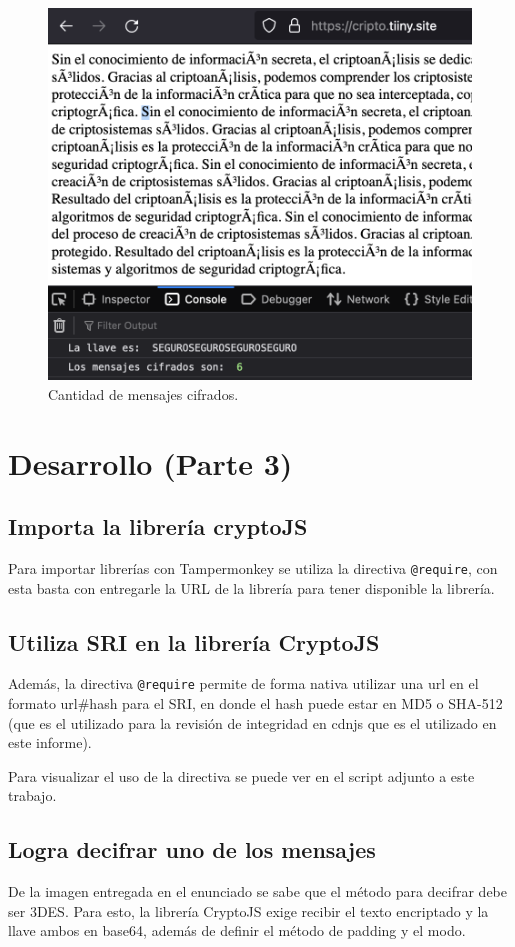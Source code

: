 \documentclass[letter,12pt]{article}
\newcommand{\code}[1]{\colorbox{lightgray!80}{\lstinline[breaklines=true]|#1|}}
\begin{document}
\begin{figure}[H]
  \centering
  \includegraphics[width=13cm]{images/02-cant-msg.png}
  \caption{Cantidad de mensajes cifrados.}
\end{figure}

\section{Desarrollo (Parte 3)}

\subsection{Importa la librería cryptoJS}
Para importar librerías con Tampermonkey se utiliza la directiva
\code{@require}, con esta basta con entregarle la URL de la librería para tener
disponible la librería.

\subsection{Utiliza SRI en la librería CryptoJS}
Además, la directiva \code{@require} permite de forma nativa utilizar una url en
el formato url\#hash para el SRI, en donde el hash puede estar en MD5 o
SHA-512 (que es el utilizado para la revisión de integridad en cdnjs que es el
utilizado en este informe).

Para visualizar el uso de la directiva se puede ver en el script adjunto a este
trabajo.

\subsection{Logra decifrar uno de los mensajes}
De la imagen entregada en el enunciado se sabe que el método para decifrar debe
ser 3DES.  Para esto, la librería CryptoJS exige recibir el texto encriptado y
la llave ambos en base64, además de definir el método de padding y el modo.
\end{document}
